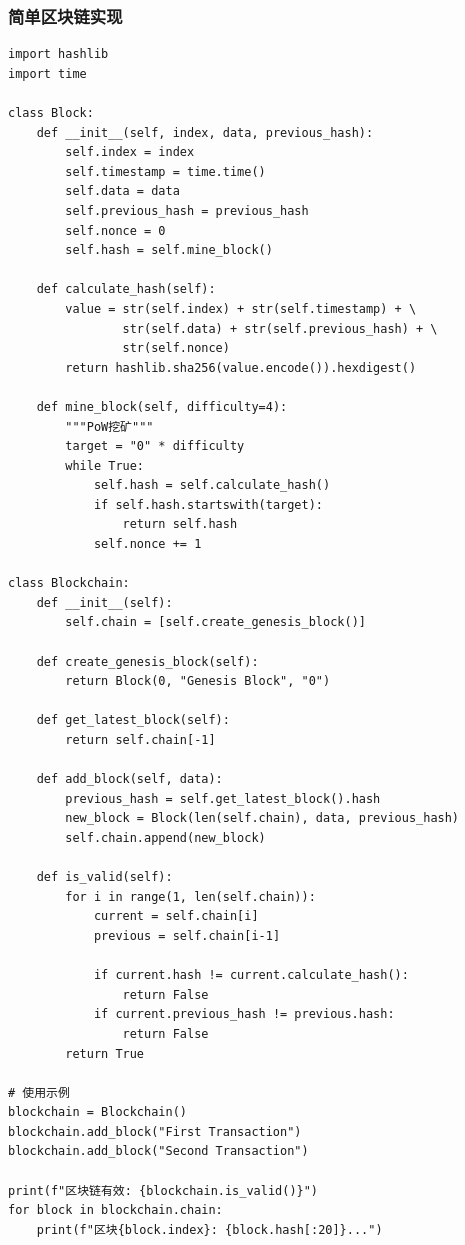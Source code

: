 ﻿\documentclass[12pt,a4paper]{article}
\begin{document}
\subsubsection{简单区块链实现}

\begin{lstlisting}
import hashlib
import time

class Block:
    def __init__(self, index, data, previous_hash):
        self.index = index
        self.timestamp = time.time()
        self.data = data
        self.previous_hash = previous_hash
        self.nonce = 0
        self.hash = self.mine_block()
    
    def calculate_hash(self):
        value = str(self.index) + str(self.timestamp) + \
                str(self.data) + str(self.previous_hash) + \
                str(self.nonce)
        return hashlib.sha256(value.encode()).hexdigest()
    
    def mine_block(self, difficulty=4):
        """PoW挖矿"""
        target = "0" * difficulty
        while True:
            self.hash = self.calculate_hash()
            if self.hash.startswith(target):
                return self.hash
            self.nonce += 1

class Blockchain:
    def __init__(self):
        self.chain = [self.create_genesis_block()]
    
    def create_genesis_block(self):
        return Block(0, "Genesis Block", "0")
    
    def get_latest_block(self):
        return self.chain[-1]
    
    def add_block(self, data):
        previous_hash = self.get_latest_block().hash
        new_block = Block(len(self.chain), data, previous_hash)
        self.chain.append(new_block)
    
    def is_valid(self):
        for i in range(1, len(self.chain)):
            current = self.chain[i]
            previous = self.chain[i-1]
            
            if current.hash != current.calculate_hash():
                return False
            if current.previous_hash != previous.hash:
                return False
        return True

# 使用示例
blockchain = Blockchain()
blockchain.add_block("First Transaction")
blockchain.add_block("Second Transaction")

print(f"区块链有效: {blockchain.is_valid()}")
for block in blockchain.chain:
    print(f"区块{block.index}: {block.hash[:20]}...")
\end{lstlisting}
\end{document}
